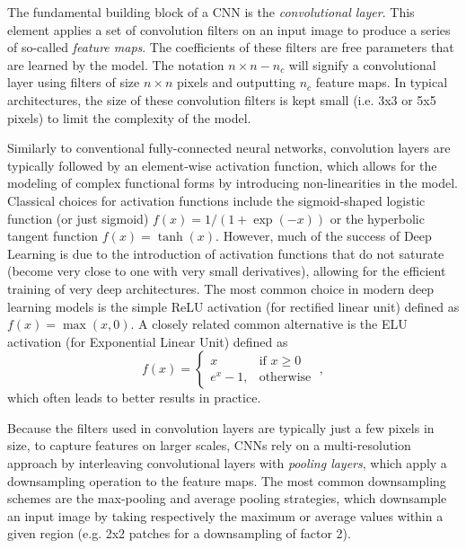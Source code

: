 \documentclass{aa}
\begin{document}
The fundamental building block of a CNN is the \textit{convolutional layer}. This element applies a set of convolution filters on an input image to produce a series of so-called \textit{feature maps}. The coefficients of these filters are free parameters that are learned by the model. The notation 
$n \times n - n_c$ will signify a convolutional layer using filters of size $n \times n$ pixels and outputting $n_c$ feature maps.  In typical architectures, the size of these convolution filters is kept small (i.e. 3x3 or 5x5 pixels) to limit the complexity of the model. 

Similarly to conventional fully-connected neural networks, convolution layers are typically followed  by an element-wise activation function, which allows for the modeling of complex functional forms  by introducing non-linearities in the model.  Classical choices  for  activation functions  include the sigmoid-shaped logistic  function (or just sigmoid) $f(x) = 1/ (1  + \exp(-x))$ or the hyperbolic tangent function $f(x) = \tanh(x)$. However, much of the success of Deep Learning is due to the  introduction of activation functions that do not saturate (become very close to one with very small derivatives), allowing for the  efficient training  of very deep architectures. The most common choice in modern deep learning models  is the simple ReLU activation (for rectified linear unit) \citep{Nair2010} defined as $f(x) = \max(x, 0 )$. A closely related  common alternative is the ELU activation (for Exponential Linear Unit) \citep{2015arXiv151107289C} defined as 
\begin{equation}
	f(x ) = \begin{cases}
    x & \text{if } x\geq 0\\
    e^{x } - 1,              & \text{otherwise}
\end{cases}\;,
\end{equation}
which often leads to better results in practice.

Because the filters used in convolution layers are  typically  just a few pixels in size, to capture features on larger scales, CNNs rely on a multi-resolution approach by interleaving convolutional layers with \textit{pooling layers}, which apply a downsampling operation to the feature maps. The most common downsampling schemes are the max-pooling and average pooling strategies, which downsample an input image by taking respectively the maximum or average values within a given region (e.g. 2x2 patches for a downsampling of factor 2).
\end{document}
